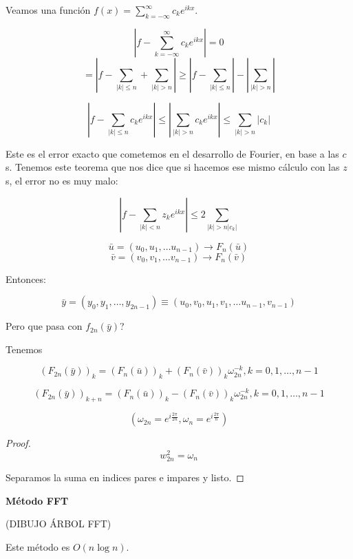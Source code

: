 			\obs Veamos una función $f(x) = \sum\limits_{k=-\infty}^{\infty} c_k e^{ikx}$.

			\[ \left|  f - \sum_{k=-\infty}^{\infty} c_k e^{ikx} \right| = 0 \]
			\[ = \left|  f - \sum_{|k|\leq n} + \sum_{|k| > n} \right| \geq \left|  f- \sum_{|k| \leq n} \right| - \left| \sum_{|k| > n} \right| \]

			\[ \left| f- \sum_{|k| \leq n} c_k e^{ikx} \right| \leq \left| \sum_{|k| > n} c_k e^{ikx} \right| \leq \sum_{|k| > n} |c_k|  \]

			Este es el error exacto que cometemos en el desarrollo de Fourier, en base a las $c$s. Tenemos este teorema que nos dice que si hacemos ese mismo cálculo con las $z$s, el error no es muy malo:

			\begin{theorem}
				\[ \left| f - \sum_{|k|< n} z_k e^{ikx}  \right| \leq 2 \sum_{|k| > n |c_k| } \]
			\end{theorem}



			\[ \bar{u} = (u_0, u_1, … u_{n-1}) \rightarrow F_n (\bar{u})  \]
			\[ \bar{v} = (v_0, v_1, … v_{n-1}) \rightarrow F_n (\bar{v})  \]

			Entonces:

			\[ \bar{y} = (y_0,y_1,…,y_{2n-1}) \equiv (u_0,v_0,u_1,v_1, … u_{n-1},v_{n-1})  \]

			Pero que pasa con $f_{2n}(\bar{y})$?

			Tenemos

			\[ \left(F_{2n} (\bar{y})\right)_k = \left(F_{n} (\bar{u})\right)_k + \left(F_{n} (\bar{v})\right)_k \omega_{2n}^{-k}, k=0,1,…,n-1 \]

			\[ \left(F_{2n} (\bar{y})\right)_{k+n} = \left(F_{n} (\bar{u})\right)_k - \left(F_{n} (\bar{v})\right)_k \omega_{2n}^{-k}, k=0,1,…,n-1 \]

			\[ (\omega_{2n} = e^{i\frac{2\pi}{2n}}, \omega_{n} = e^{i \frac{2\pi}{n}})  \]

			\begin{proof}

				\[ w_{2n}^2 = \omega_{n} \]

				Separamos la suma en indices pares e impares y listo.

			\end{proof}

			\textbf{Método FFT}

			(DIBUJO ÁRBOL FFT)

			Este método es $O(n \log n)$.









